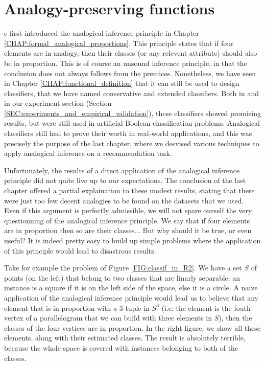 \chapter{Analogy-preserving functions}

e first introduced the analogical inference principle in Chapter
\ref{CHAP:formal_analogical_proportions}. This principle states that if four
elements are in analogy, then their classes (or any relevent attribute) should
also be in proportion. This is of course an unsound inference principle, in
that the conclusion does not always follows from the premices. Nonetheless, we
have seen in Chapter \ref{CHAP:functional_definition} that it can still be used to
design classifiers, that we have named conservative and extended classifiers.
Both in \cite{BayMicDelIJCAI07} and in our experiment section (Section
\ref{SEC:experiments_and_empirical_validation}), these classifiers showed
promising results, but were still used in artificial Boolean classification
problems. Analogical classifiers still had to prove their worth in real-world
applications, and this was precisely the purpose of the last chapter, where we
desvised various techniques to apply analogical inference on a recommendation
task.

Unfortunately, the results of a direct application of the analogical inference
principle did not quite live up to our expectations. The conclusion of the last
chapter offered a partial explaination to these modest results, stating that
there were just too few decent analogies to be found on the datasets that we
used. Even if this argument is perfectly admissible, we will not spare ourself
the very questionning of the analogical inference principle. We say that if
four elements are in proportion then so are their classes... But why should it
be true, or even useful? It is indeed pretty easy to build up simple problems
where the application of this principle would lead to disastrous results.

Take for example the problem of Figure \ref{FIG:classif_in_R2}. We have
a set $S$ of points (on the left) that belong to two classes that are linarly
separable: an instance is a square if it is on the left side of the space, else
it is a circle. A naive application of the analogical inference principle would
lead us to believe that any element that is in proportion with a $3$-tuple in
$S^3$ (i.e. the element is the fouth vertex of a parallelogram that we can
build with three elements in $S$), then the classes of the four vertices are in
proportion. In the right figure, we show all these elements, along with their
estimated classes. The result is absolutely terrible, because the whole space is
covered with instances belonging to both of the classes.

